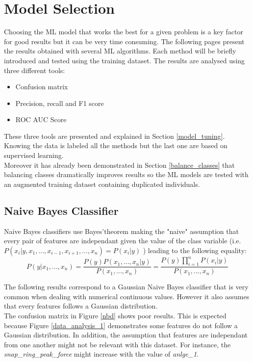 \section{Model Selection}
Choosing the ML model that works the best for a given problem is a key factor for good results but it can be very time consuming. The following pages present the results obtained with several ML algorithms. Each method will be briefly introduced and tested using the training dataset. The results are analysed using three different tools:
\begin{itemize}
    \item Confusion matrix
    \item Precision, recall and F1 score
    \item ROC AUC Score
\end{itemize}
These three tools are presented and explained in Section \ref{model_tuning}.\\
Knowing the data is labeled all the methods but the last one are based on supervised learning.\\
Moreover it has already been demonstrated in Section \ref{balance_classes} that balancing classes dramatically improves results so the ML models are tested with an augmented training dataset containing duplicated individuals.


\subsection{Naive Bayes Classifier}
Naive Bayes classifiers use Bayes'theorem making the "naive" assumption that every pair of features are independant given the value of the class variable \cite{nbc_scikit} (i.e. \(P(x_i | y, x_1,..., x_{i-1}, x_{i+1},..., x_n) = P(x_i | y)\) ) leading to the following equality:
\[ P(y | x_1,..., x_n) = \frac{P(y)P(x_1,..., x_n | y)}{P(x_1,..., x_n)} = \frac{P(y)\prod_{i=1}^n P(x_i | y)}{P(x_1,..., x_n)} \]

The following results correspond to a Gaussian Naive Bayes\cite{nbcg_scikit} classifier that is very common when dealing with numerical continuous values. However it also assumes that every features follows a Gaussian distribution.\\

The confusion matrix in Figure \ref{nbd} shows poor results. This is expected because Figure \ref{data_analysis_1} demonstrates some features do not follow a Gaussian distribution. In addition, the assumption that features are independant from one another might not be relevant with this dataset. For instance, the \textit{snap\_ring\_peak\_force} might increase with the value of \textit{anlge\_1}.

